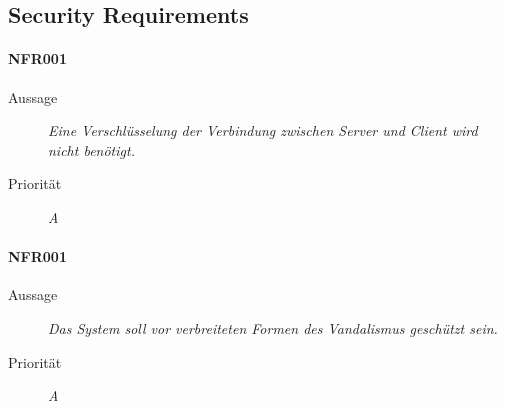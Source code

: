 \subsection{Security Requirements}

\paragraph{NFR001}
\begin{description}
  \item[Aussage] \textit{Eine Verschl\"usselung der Verbindung zwischen Server und Client wird nicht ben\"otigt.}
  \item[Priorit\"at] \textit{A}
\end{description}

\paragraph{NFR001}
\begin{description}
  \item[Aussage] \textit{Das System soll vor verbreiteten Formen des Vandalismus gesch\"utzt sein.}
  \item[Priorit\"at] \textit{A}
\end{description}